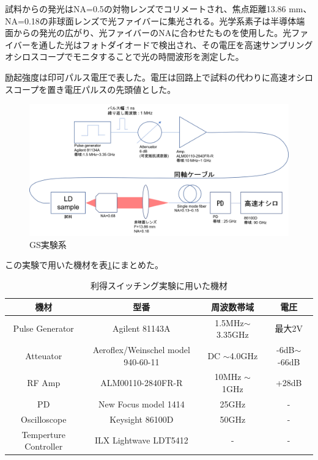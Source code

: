 試料からの発光はNA=0.5の対物レンズでコリメートされ、焦点距離13.86 mm、NA=0.18の非球面レンズで光ファイバーに集光される。光学系素子は半導体端面からの発光の広がり、光ファイバーのNAに合わせたものを使用した。光ファイバーを通した光はフォトダイオードで検出され、その電圧を高速サンプリングオシロスコープでモニタすることで光の時間波形を測定した。

励起強度は印可パルス電圧で表した。電圧は回路上で試料の代わりに高速オシロスコープを置き電圧パルスの先頭値とした。
\begin{figure}[h]
	\includegraphics[width=15cm]{figure/fig_2_3_GS_setup.png}
	\caption{GS実験系}
	\label{fig:fig_2_3_GS_setup}
\end{figure}


この実験で用いた機材を表\ref{table:table_2_2_GS_setup}にまとめた。
\begin{table}[h]
  \caption{利得スイッチング実験に用いた機材}
  \label{table:table_2_2_GS_setup}
  \centering
  \begin{tabular}{cccc}
    \hline
    機材  & 型番   & 周波数帯域 &電圧 \\
    \hline \hline
    Pulse Generator  & Agilent 81143A & 1.5MHz$\sim$ 3.35GHz  &最大2V \\
    Atteuator  &  Aeroflex/Weinschel model 940-60-11    & DC $\sim$4.0GHz& -6dB$\sim$ -66dB\\
    RF Amp & ALM00110-2840FR-R & 10MHz $\sim$ 1GHz & +28dB\\
    PD & New Focus model 1414 & 25GHz &-\\
    Oscilloscope  &  Keysight 86100D & 50GHz  &-\\
     Temperture Controller & ILX Lightwave  LDT5412&-&-\\
       \hline
  \end{tabular}
\end{table}
